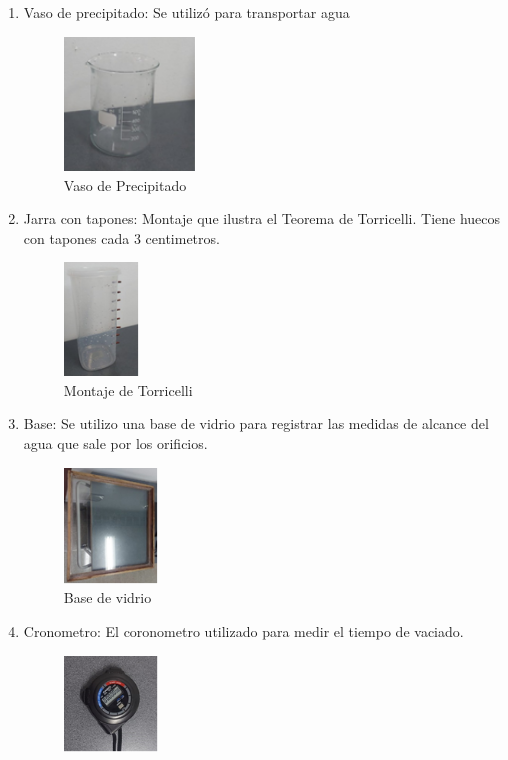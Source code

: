 \documentclass[journal,transmag]{IEEEtran}
\begin{document}
	\begin{enumerate}
	
  \item Vaso de precipitado: Se utilizó para transportar agua
			\begin{figure}[!h]
		\center
		\includegraphics[width=3.5cm]{imagen1.png}
		\caption{Vaso de Precipitado}
		\label{1}
		\end{figure}
  \item Jarra con tapones: Montaje que ilustra el Teorema de Torricelli.  Tiene huecos con tapones cada 3 centimetros.
			 \begin{figure}[!h]
		\center
		\includegraphics[width=2cm]{imagen2.png}
		\caption{Montaje de Torricelli}
		\label{2}
		\end{figure}
  \item Base: Se utilizo una base de vidrio para registrar las medidas de alcance del agua que sale por los orificios.
			 \begin{figure}[!h]
		\center
		\includegraphics[width=2.5cm]{imagen3.png}
		\caption{Base de vidrio}
		\label{3}
		\end{figure}
 \item Cronometro: El coronometro utilizado para medir el tiempo de vaciado.
				 \begin{figure}[!h]
			\center
			\includegraphics[width=2.5cm]{imagen4.png}

\end{figure}
\end{enumerate}
\end{document}

